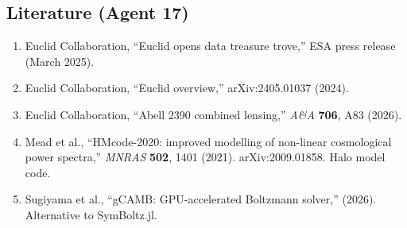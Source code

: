 \documentclass[11pt,a4paper]{article}
\begin{document}
\subsection{Literature (Agent 17)}

\begin{enumerate}
\item Euclid Collaboration, ``Euclid opens data treasure trove,'' ESA press release (March 2025).
\item Euclid Collaboration, ``Euclid overview,'' arXiv:2405.01037 (2024).
\item Euclid Collaboration, ``Abell 2390 combined lensing,'' \textit{A\&A} \textbf{706}, A83 (2026).
\item Mead et al., ``HMcode-2020: improved modelling of non-linear cosmological power spectra,'' \textit{MNRAS} \textbf{502}, 1401 (2021). arXiv:2009.01858. Halo model code.
\item Sugiyama et al., ``gCAMB: GPU-accelerated Boltzmann solver,'' (2026). Alternative to SymBoltz.jl.
\end{enumerate}
\end{document}

